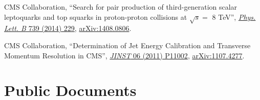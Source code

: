 \begin{description}[leftmargin=12pt,font=\normalfont,labelsep=0em]
\item CMS Collaboration, ``Search for pair production of third-generation scalar leptoquarks and top squarks in proton-proton collisions at $\sqrt{s} =$ 8 TeV'', \href{http://dx.doi.org/10.1016/j.physletb.2014.10.063}{\emph{Phys. Lett. B} 739 (2014) 229}, \href{http://arxiv.org/abs/1408.0806}{arXiv:1408.0806}. %
\item CMS Collaboration, ``Determination of Jet Energy Calibration and Transverse Momentum Resolution in CMS'', \href{http://dx.doi.org/10.1088/1748-0221/6/11/P11002}{\emph{JINST} 06 (2011) P11002}, \href{http://arxiv.org/abs/1107.4277}{arXiv:1107.4277}. %
\end{description}

\section{Public Documents}
